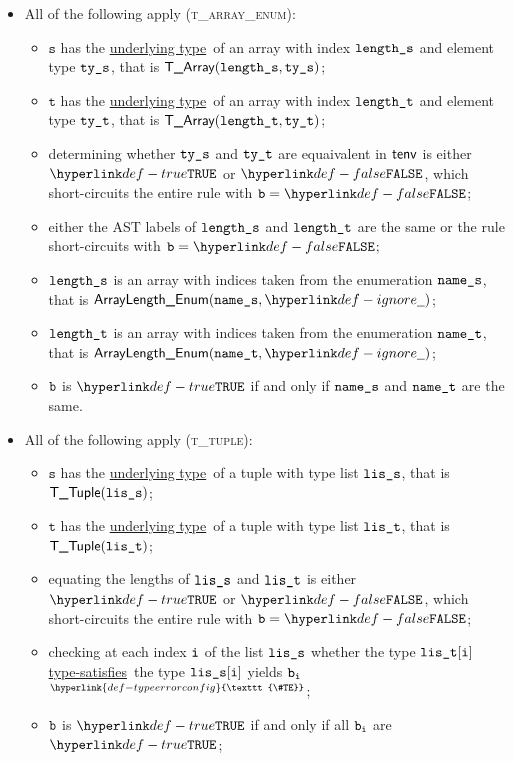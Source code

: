 \documentclass{book}
\newcommand\TypeErrorConfig[0]{\hyperlink{def-typeerrorconfig}{\texttt{\#TE}}}
\newcommand\ProseOrTypeError[0]{\hyperlink{def-proseortypeerror}{$^{\TypeErrorConfig}$}}
\newcommand\underlyingtype[0]{\hyperlink{def-underlyingtype}{underlying type}}
\newcommand\typesatisfies[0]{\hyperlink{def-typesatisfies}{type-satisfies}}
\newcommand\vt[0]{\texttt{t}}
\newcommand\vs[0]{\texttt{s}}
\begin{document}
\begin{itemize}
  \item All of the following apply (\textsc{t\_array\_enum}):
  \begin{itemize}
  \item $\vs$ has the \underlyingtype\ of an array with index $\texttt{length\_s}$ and element type $\texttt{ty\_s}$, that is $\textsf{T\_Array}(\texttt{length\_s}, \texttt{ty\_s})$;
  \item $\vt$ has the \underlyingtype\ of an array with index $\texttt{length\_t}$ and element type $\texttt{ty\_t}$, that is $\textsf{T\_Array}(\texttt{length\_t}, \texttt{ty\_t})$;
  \item determining whether $\texttt{ty\_s}$ and $\texttt{ty\_t}$ are equaivalent in $\textsf{tenv}$ is either $\True$
  or $\False$, which short-circuits the entire rule with $\vb=\False$;
  \item either the AST labels of $\texttt{length\_s}$ and $\texttt{length\_t}$ are the same or the rule short-circuits with $\vb=\False$;
  \item $\texttt{length\_s}$ is an array with indices taken from the enumeration $\texttt{name\_s}$, that is $\ArrayLengthEnum(\vnames, \Ignore)$;
  \item $\texttt{length\_t}$ is an array with indices taken from the enumeration $\texttt{name\_t}$, that is $\ArrayLengthEnum(\vnamet, \Ignore)$;
  \item $\texttt{b}$ is $\True$ if and only if $\texttt{name\_s}$ and $\texttt{name\_t}$ are the same.
  \end{itemize}

\item All of the following apply (\textsc{t\_tuple}):
  \begin{itemize}
  \item $\vs$ has the \underlyingtype\ of a tuple with type list $\texttt{lis\_s}$, that is $\textsf{T\_Tuple}(\texttt{lis\_s})$;
  \item $\vt$ has the \underlyingtype\ of a tuple with type list $\texttt{lis\_t}$, that is $\textsf{T\_Tuple}(\texttt{lis\_t})$;
  \item equating the lengths of $\texttt{lis\_s}$ and $\texttt{lis\_t}$ is either $\True$ or $\False$, which short-circuits
  the entire rule with $\vb=\False$;
  \item checking at each index $\texttt{i}$ of the list $\texttt{lis\_s}$ whether the type $\texttt{lis\_t}[\texttt{i}]$ \typesatisfies\ the type $\texttt{lis\_s}[\texttt{i}]$
  yields $\texttt{b}_{\texttt{i}}$ \ProseOrTypeError;
  \item $\texttt{b}$ is $\True$ if and only if all $\texttt{b}_{\texttt{i}}$ are $\True$;
  \end{itemize}


\end{itemize}
\end{document}
